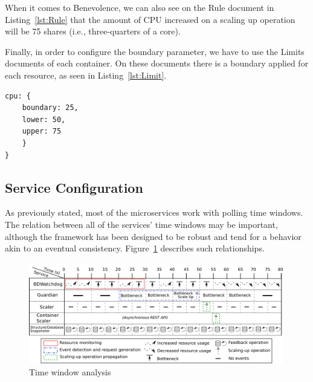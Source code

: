 \documentclass[12pt]{article}
\begin{document}
When it comes to Benevolence, we can also see on the Rule document in Listing~\ref{lst:Rule} that the amount of CPU increased on a scaling up operation will be 75 shares (i.e., three-quarters of a core).

Finally, in order to configure the boundary parameter, we have to use the Limits documents of each container. On these documents there is a boundary applied for each resource, as seen in Listing~\ref{lst:Limit}.

\begin{center}
	\lstset{basicstyle=\footnotesize}
	\lstset{linewidth=1\textwidth}
	\lstset{language=perl}
	\lstset{xleftmargin=0.0725\textwidth}
	\lstset{showstringspaces=false}
	\lstset{captionpos=b}
	\lstset{numbers=left}
	\lstset{tabsize=1}
	\begin{lstlisting}[float=bt,frame=bt,caption=Example of a Limit document,label=lst:Limit]
cpu: {
	boundary: 25,
	lower: 50,
	upper: 75
	}
}
	\end{lstlisting}
\end{center}


\subsection{Service Configuration}

As previously stated, most of the microservices work with polling time windows. The relation between all of the services' time windows may be important, although the framework has been designed to be robust and tend for a behavior akin to an eventual consistency. Figure~\ref{fig:TimeWindowAnalysis} describes such relationships.

\begin{figure}[!tb]
	\centering
	\includegraphics[width=0.99\textwidth]{../img/configuration/time_window_analysis.png}
	\caption{Time window analysis}
	\label{fig:TimeWindowAnalysis}
\end{figure}
\end{document}
